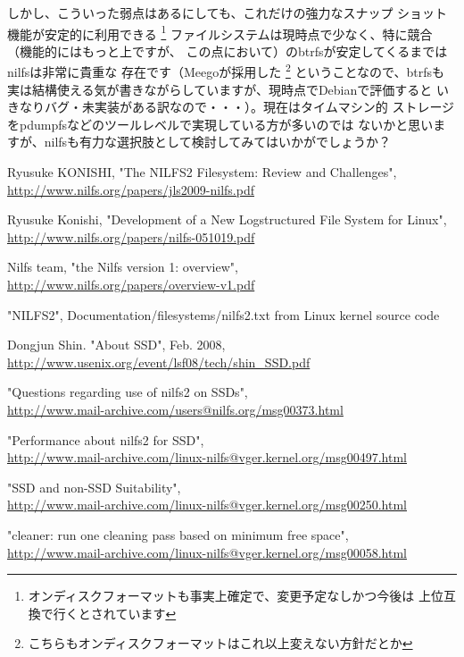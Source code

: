 \documentclass[mingoth,a4paper]{jsarticle}
\begin{document}
しかし、こういった弱点はあるにしても、これだけの強力なスナップ
ショット機能が安定的に利用できる
\footnote{オンディスクフォーマットも事実上確定で、変更予定なしかつ今後は
上位互換で行くとされています\cite{nilready}}
ファイルシステムは現時点で少なく、特に競合（機能的にはもっと上ですが、
この点において）のbtrfsが安定してくるまではnilfsは非常に貴重な
存在です（Meegoが採用した
\footnote{こちらもオンディスクフォーマットはこれ以上変えない方針だとか}
\cite{nilbtrme}ということなので、btrfsも
実は結構使える気が書きながらしていますが、現時点でDebianで評価すると
いきなりバグ・未実装がある訳なので・・・）。現在はタイムマシン的
ストレージをpdumpfsなどのツールレベルで実現している方が多いのでは
ないかと思いますが、nilfsも有力な選択肢として検討してみてはいかがでしょうか？

\begin{thebibliography}{0}
 Ryusuke KONISHI, "The NILFS2 Filesystem: Review and Challenges", \\
\url{http://www.nilfs.org/papers/jls2009-nilfs.pdf}

 Ryusuke Konishi, "Development of a New Logstructured File System for Linux", \\
\url{http://www.nilfs.org/papers/nilfs-051019.pdf}

 Nilfs team, "the Nilfs version 1: overview", \\
\url{http://www.nilfs.org/papers/overview-v1.pdf}

 "NILFS2", Documentation/filesystems/nilfs2.txt from Linux kernel source code

 Dongjun Shin. "About SSD", Feb. 2008, \\
\url{http://www.usenix.org/event/lsf08/tech/shin\_SSD.pdf}

 "Questions regarding use of nilfs2 on SSDs", \\
\url{http://www.mail-archive.com/users@nilfs.org/msg00373.html}

 "Performance about nilfs2 for SSD", \\
\url{http://www.mail-archive.com/linux-nilfs@vger.kernel.org/msg00497.html}

 "SSD and non-SSD Suitability", \\
\url{http://www.mail-archive.com/linux-nilfs@vger.kernel.org/msg00250.html}

 "cleaner: run one cleaning pass based on minimum free space", \\
\url{http://www.mail-archive.com/linux-nilfs@vger.kernel.org/msg00058.html}


\end{thebibliography}
\end{document}
